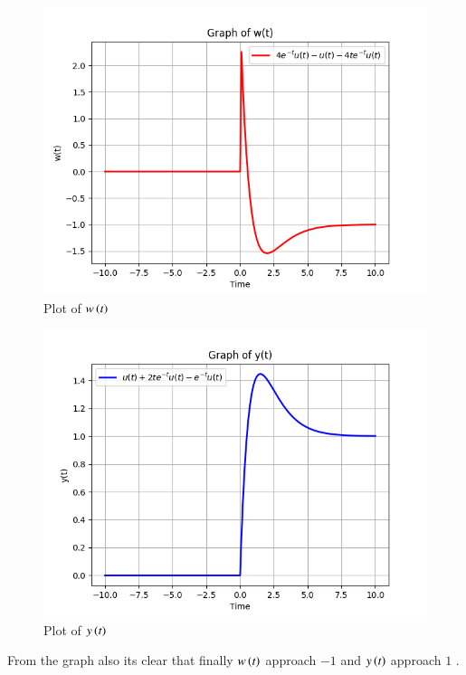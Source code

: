 \documentclass[journal,12pt,twocolumn]{IEEEtran}
\theoremstyle{remark}
\begin{document}
\begin{figure}[H]
    \includegraphics[width=1\columnwidth]{figs/Plot of w(t).png}
    \caption{Plot of $w\left(t\right)$}
    \label{fig:w_t}
\end{figure}

\begin{figure}[H]
    \includegraphics[width=1\columnwidth]{figs/Plot of y(t).png}
    \caption{Plot of $y\left(t\right)$}
    \label{fig:y_t}
\end{figure}

From the graph also its clear that finally $w\left(t\right)$ approach $-1$ and $y\left(t\right)$ approach $1$ .
\end{document}
